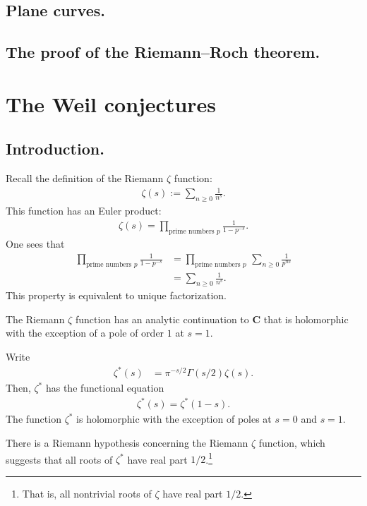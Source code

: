 \documentclass [11 pt, oneside] {article}
\begin{document}
\subsection{Plane curves.}
\subsection{The proof of the Riemann--Roch theorem.}
\fi

\section{The Weil conjectures}
\subsection{Introduction.}
Recall the definition of the Riemann $\zeta$ function:
\begin{align*}
	\zeta(s) := \sum_{n\ge 0}^{} \frac{1}{n^s}.
\end{align*}
This function has an Euler product:
\begin{align*}
	\zeta(s) = \prod_{\textrm{prime numbers $p$}} \frac{1}{1-p^{-s}}.
\end{align*}
One sees that
\begin{align*}
	\prod_{\textrm{prime numbers $p$}} \frac{1}{1-p^{-s}} &= \prod_{\textrm{prime numbers $p$}} \,\sum_{n\ge 0}^{} \frac{1}{p^{ns}}\\
							     &= \sum_{n\ge 0}^{} \frac{1}{n^s}.
\end{align*}
This property is equivalent to unique factorization.

The Riemann $\zeta$ function has an analytic continuation to $\mathbf{C}$ that is holomorphic with the exception of a pole of order $1$ at $s=1$.

Write
\begin{align*}
	\zeta^*(s) &= \pi^{-s/2} \Gamma (s/2) \zeta (s).
\end{align*}
Then, $\zeta^*$ has the functional equation
\begin{align*}
	\zeta^*(s) = \zeta^* (1-s).
\end{align*}
The function $\zeta^*$ is holomorphic with the exception of poles at $s=0$ and $s=1$.

There is a Riemann hypothesis concerning the Riemann $\zeta$ function, which suggests that all roots of $\zeta^*$ have real part $1/2$.\footnote{That is, all nontrivial roots of $\zeta$ have real part $1/2$.}
\end{document}
